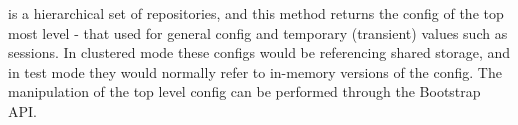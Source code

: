 \Rapture is a hierarchical set of repositories, and this method returns the config of the top most level - that used
for general config and temporary (transient) values such as sessions. In clustered mode these configs would
be referencing shared storage, and in test mode they would normally refer to in-memory versions of the config.
The manipulation of the top level config can be performed through the Bootstrap API.
